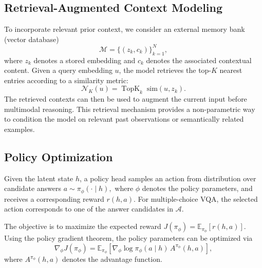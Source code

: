 \documentclass[letterpaper, 10 pt, conference]{ieeeconf}  %
\begin{document}
{\subsection{Retrieval-Augmented Context Modeling}

To incorporate relevant prior context, we consider an external memory bank (vector database)
\begin{equation}
\mathcal{M} = \{(z_k, c_k)\}_{k=1}^{N},
\end{equation}
where $z_k$ denotes a stored embedding and $c_k$ denotes the associated contextual content. Given a query embedding $u$, the model retrieves the top-$K$ nearest entries according to a similarity metric:
\begin{equation}
\mathcal{N}_K(u) = \operatorname{TopK}_{k}\; \mathrm{sim}(u,z_k).
\end{equation}
The retrieved contexts can then be used to augment the current input before multimodal reasoning. This retrieval mechanism provides a non-parametric way to condition the model on relevant past observations or semantically related examples.

\subsection{Policy Optimization}

Given the latent state $h$, a policy head samples an action from distribution over candidate answers $a\sim\pi_{\phi}(\cdot \mid h),$
where $\phi$ denotes the policy parameters, and receives a corresponding reward $r(h,a)$. For multiple-choice VQA, the selected action corresponds to one of the answer candidates in $\mathcal{A}$.

The objective is to maximize the expected reward $J(\pi_{\phi}) = \mathbb{E}_{\pi_{\phi}}[r(h,a)].$
Using the policy gradient theorem, the policy parameters can be optimized via
\begin{equation}
\nabla_{\phi} J(\pi_{\phi})
=
\mathbb{E}_{\pi_{\phi}}
\left[
\nabla_{\phi}\log \pi_{\phi}(a \mid h)\,
A^{\pi_{\phi}}(h,a)
\right],
\end{equation}
where $A^{\pi_{\phi}}(h,a)$ denotes the advantage function.} %
\end{document}
